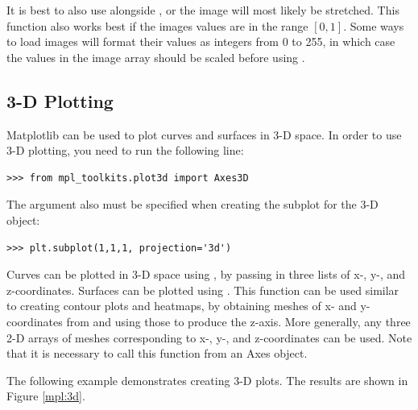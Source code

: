 It is best to also use  alongside , or the image will most likely be stretched.
This function also works best if the images values are in the range $[0,1]$.
Some ways to load images will format their values as integers from 0 to 255, in which case the values in the image array should be scaled before using .

\subsection*{3-D Plotting}
Matplotlib can be used to plot curves and surfaces in 3-D space.
In order to use 3-D plotting, you need to run the following line:
\begin{lstlisting}
>>> from mpl_toolkits.plot3d import Axes3D
\end{lstlisting}
The argument  also must be specified when creating the subplot for the 3-D object:
\begin{lstlisting}
>>> plt.subplot(1,1,1, projection='3d')
\end{lstlisting}

Curves can be plotted in 3-D space using , by passing in three lists of x-, y-, and z-coordinates.
Surfaces can be plotted using .
This function can be used similar to creating contour plots and heatmaps, by obtaining meshes of x- and y- coordinates from  and using those to produce the z-axis.
More generally, any three 2-D arrays of meshes corresponding to x-, y-, and z-coordinates can be used.
Note that it is necessary to call this function from an Axes object.

The following example demonstrates creating 3-D plots. The results are shown in Figure \ref{mpl:3d}.


